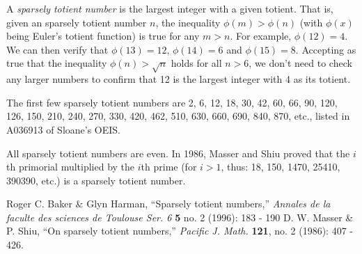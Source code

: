 \documentclass[12pt]{article}
\begin{document}
A {\em sparsely totient number} is the largest integer with a given totient. That is, given an sparsely totient number $n$, the inequality $\phi(m) > \phi(n)$ (with $\phi(x)$ being Euler's totient function) is true for any $m > n$. For example, $\phi(12) = 4$. We can then verify that $\phi(13) = 12$, $\phi(14) = 6$ and $\phi(15) = 8$. Accepting as true that the inequality $\phi(n) > \sqrt{n}$ holds for all $n > 6$, we don't need to check any larger numbers to confirm that 12 is the largest integer with 4 as its totient.

The first few sparsely totient numbers are 2, 6, 12, 18, 30, 42, 60, 66, 90, 120, 126, 150, 210, 240, 270, 330, 420, 462, 510, 630, 660, 690, 840, 870, etc., listed in A036913 of Sloane's OEIS.

All sparsely totient numbers are even. In 1986, Masser and Shiu proved that the $i$th primorial multiplied by the $i$th prime (for $i > 1$, thus: 18, 150, 1470, 25410, 390390, etc.) is a sparsely totient number.

\begin{thebibliography}{2}
 Roger C. Baker \& Glyn Harman, ``Sparsely totient numbers,'' {\it Annales de la faculte des sciences de Toulouse Ser. 6} {\bf 5} no. 2 (1996): 183 - 190
 D. W. Masser \& P. Shiu, ``On sparsely totient numbers,'' {\it Pacific J. Math.} {\bf 121}, no. 2 (1986): 407 - 426. 
\end{thebibliography}
\end{document}
